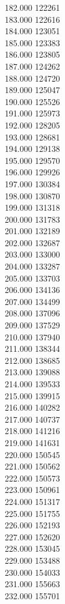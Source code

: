 { 182.000	122261 \\
 183.000	122616 \\
 184.000	123051 \\
 185.000	123383 \\
 186.000	123805 \\
 187.000	124262 \\
 188.000	124720 \\
 189.000	125047 \\
 190.000	125526 \\
 191.000	125973 \\
 192.000	128205 \\
 193.000	128681 \\
 194.000	129138 \\
 195.000	129570 \\
 196.000	129926 \\
 197.000	130384 \\
 198.000	130870 \\
 199.000	131318 \\
 200.000	131783 \\
 201.000	132189 \\
 202.000	132687 \\
 203.000	133000 \\
 204.000	133287 \\
 205.000	133703 \\
 206.000	134136 \\
 207.000	134499 \\
 208.000	137096 \\
 209.000	137529 \\
 210.000	137940 \\
 211.000	138344 \\
 212.000	138685 \\
 213.000	139088 \\
 214.000	139533 \\
 215.000	139915 \\
 216.000	140282 \\
 217.000	140737 \\
 218.000	141216 \\
 219.000	141631 \\
 220.000	150545 \\
 221.000	150562 \\
 222.000	150573 \\
 223.000	150961 \\
 224.000	151317 \\
 225.000	151755 \\
 226.000	152193 \\
 227.000	152620 \\
 228.000	153045 \\
 229.000	153488 \\
 230.000	154033 \\
 231.000	155663 \\
 232.000	155701 \\
}
